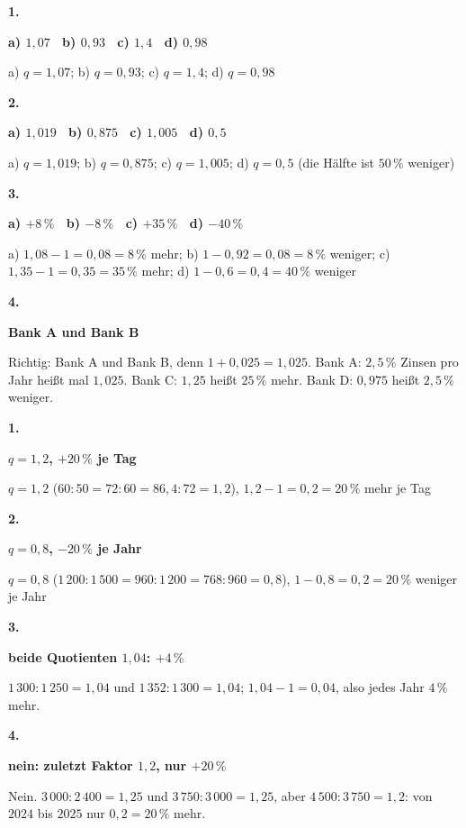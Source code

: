 \documentclass[11pt]{article}
\newcommand{\lsg}[3]{\par\noindent\begin{minipage}[t]{9mm}\textbf{#1}\end{minipage}%
  \begin{minipage}[t]{52mm}\raggedright\bfseries\boldmath #2\end{minipage}\hspace{3mm}%
  \begin{minipage}[t]{\dimexpr\linewidth-64mm\relax}\raggedright\small #3\end{minipage}\par\vspace{4pt}}
\begin{document}
\par\smallskip
{}\par
\par\Needspace{25mm}\vspace{6pt}\noindent\colorbox{black!12}{}\hspace{2mm}{\bfseries Faktor und Prozentsatz}\par\vspace{4pt}
\lsg{1.}{a) $1{,}07$ \ b) $0{,}93$ \ c) $1{,}4$ \ d) $0{,}98$}{a) $q = 1{,}07$; b) $q = 0{,}93$; c) $q = 1{,}4$; d) $q = 0{,}98$}
\lsg{2.}{a) $1{,}019$ \ b) $0{,}875$ \ c) $1{,}005$ \ d) $0{,}5$}{a) $q = 1{,}019$; b) $q = 0{,}875$; c) $q = 1{,}005$; d) $q = 0{,}5$ (die Hälfte ist $50\,\%$ weniger)}
\lsg{3.}{a) $+8\,\%$ \ b) $-8\,\%$ \ c) $+35\,\%$ \ d) $-40\,\%$}{a) $1{,}08 - 1 = 0{,}08 = 8\,\%$ mehr; b) $1 - 0{,}92 = 0{,}08 = 8\,\%$ weniger; c) $1{,}35 - 1 = 0{,}35 = 35\,\%$ mehr; d) $1 - 0{,}6 = 0{,}4 = 40\,\%$ weniger}
\lsg{4.}{Bank A und Bank B}{Richtig: Bank A und Bank B, denn $1 + 0{,}025 = 1{,}025$. Bank A: $2{,}5\,\%$ Zinsen pro Jahr heißt mal $1{,}025$. Bank C: $1{,}25$ heißt $25\,\%$ mehr. Bank D: $0{,}975$ heißt $2{,}5\,\%$ weniger.}
\par\Needspace{25mm}\vspace{6pt}\noindent\colorbox{black!12}{}\hspace{2mm}{\bfseries Faktor aus der Tabelle}\par\vspace{4pt}
\lsg{1.}{$q = 1{,}2$, $+20\,\%$ je Tag}{$q = 1{,}2$ ($60 : 50 = 72 : 60 = 86{,}4 : 72 = 1{,}2$), $1{,}2 - 1 = 0{,}2 = 20\,\%$ mehr je Tag}
\lsg{2.}{$q = 0{,}8$, $-20\,\%$ je Jahr}{$q = 0{,}8$ ($1\,200 : 1\,500 = 960 : 1\,200 = 768 : 960 = 0{,}8$), $1 - 0{,}8 = 0{,}2 = 20\,\%$ weniger je Jahr}
\lsg{3.}{beide Quotienten $1{,}04$: $+4\,\%$}{$1\,300 : 1\,250 = 1{,}04$ und $1\,352 : 1\,300 = 1{,}04$; $1{,}04 - 1 = 0{,}04$, also jedes Jahr $4\,\%$ mehr.}
\lsg{4.}{nein: zuletzt Faktor $1{,}2$, nur $+20\,\%$}{Nein. $3\,000 : 2\,400 = 1{,}25$ und $3\,750 : 3\,000 = 1{,}25$, aber $4\,500 : 3\,750 = 1{,}2$: von $2024$ bis $2025$ nur $0{,}2 = 20\,\%$ mehr.}
\par\Needspace{25mm}\vspace{6pt}\noindent\colorbox{black!12}{}\hspace{2mm}{\bfseries Tabelle fortschreiben}\par\vspace{4pt}
\end{document}
